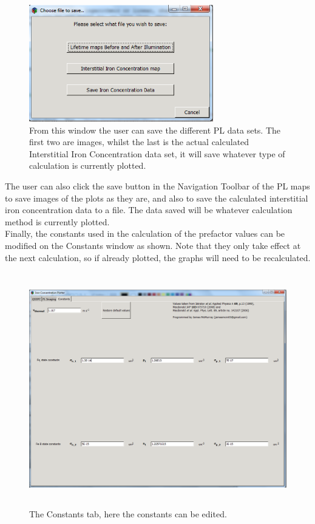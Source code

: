 \documentclass[final,a4paper,oneside,12pt]{article}
\begin{document}
\begin{figure}[h!]
\includegraphics[height=2in]{2whichsave}
\caption{\label{figure2} From this window the user can save the different PL data sets. The first two are images, whilst the last is the actual calculated Interstitial Iron Concentration data set, it will save whatever type of calculation is currently plotted.}
\end{figure}

The user can also click the save button in the Navigation Toolbar of the PL maps to save images of the plots as they are, and also to save the calculated interstitial iron concentration data to a file. The data saved will be whatever calculation method is currently plotted.
\\

Finally, the constants used in the calculation of the prefactor values can be modified on the Constants window as shown. Note that they only take effect at the next calculation, so if already plotted, the graphs will need to be recalculated.

\begin{figure}[h!]
\includegraphics[height=4in]{2constants}
\caption{\label{figure3} The Constants tab, here the constants can be edited.}
\end{figure}
\end{document}
